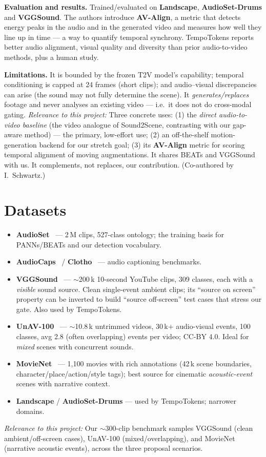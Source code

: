 \documentclass[11pt,a4paper]{article}
\newcommand{\rel}[1]{\smallskip\noindent\textit{Relevance to this project:} #1}
\begin{document}
\textbf{Evaluation and results.} Trained/evaluated on \textbf{Landscape}, \textbf{AudioSet-Drums} and
\textbf{VGGSound}. The authors introduce \textbf{AV-Align}, a metric that detects energy peaks in the
audio and in the generated video and measures how well they line up in time --- a way to quantify
temporal synchrony. TempoTokens reports better audio alignment, visual quality and diversity than
prior audio-to-video methods, plus a human study.

\textbf{Limitations.} It is bounded by the frozen T2V model's capability; temporal conditioning is
capped at 24 frames (short clips); and audio--visual discrepancies can arise (the sound may not fully
determine the scene). It \emph{generates/replaces} footage and never analyses an existing video ---
i.e.\ it does not do cross-modal gating.
\rel{Three concrete uses: (1) the \emph{direct audio-to-video baseline} (the video analogue of
Sound2Scene, contrasting with our gap-aware method) --- the primary, low-effort use; (2) an
off-the-shelf motion-generation backend for our stretch goal; (3) its \textbf{AV-Align} metric for
scoring temporal alignment of moving augmentations. It shares BEATs and VGGSound with us. It
complements, not replaces, our contribution. (Co-authored by I.\ Schwartz.)}

\section{Datasets}
\begin{itemize}
  \item \textbf{AudioSet}~\cite{audioset} --- 2\,M clips, 527-class ontology; the training basis for
    PANNs/BEATs and our detection vocabulary.
  \item \textbf{AudioCaps}~\cite{audiocaps} / \textbf{Clotho}~\cite{clotho} --- audio captioning
    benchmarks.
  \item \textbf{VGGSound}~\cite{vggsound} --- $\sim$200\,k 10-second YouTube clips, 309 classes, each
    with a \emph{visible} sound source. Clean single-event ambient clips; its ``source on screen''
    property can be inverted to build ``source off-screen'' test cases that stress our gate. Also used
    by TempoTokens.
  \item \textbf{UnAV-100}~\cite{unav100} --- $\sim$10.8\,k untrimmed videos, 30\,k$+$ audio-visual
    events, 100 classes, avg 2.8 (often overlapping) events per video; CC-BY 4.0. Ideal for
    \emph{mixed} scenes with concurrent sounds.
  \item \textbf{MovieNet}~\cite{movienet} --- 1{,}100 movies with rich annotations (42\,k scene
    boundaries, character/place/action/style tags); best source for cinematic \emph{acoustic-event}
    scenes with narrative context.
  \item \textbf{Landscape} / \textbf{AudioSet-Drums} --- used by TempoTokens; narrower domains.
\end{itemize}
\rel{Our $\sim$300-clip benchmark samples VGGSound (clean ambient/off-screen cases), UnAV-100
(mixed/overlapping), and MovieNet (narrative acoustic events), across the three proposal scenarios.}
\end{document}
